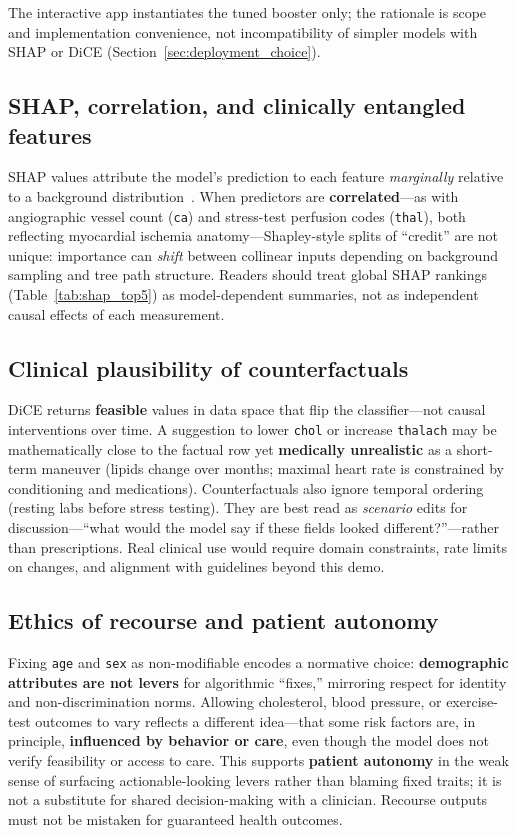 \documentclass[11pt,a4paper]{article}
\begin{document}
The interactive app instantiates the tuned booster only; the rationale is scope and implementation convenience, not incompatibility of simpler models with SHAP or DiCE (Section~\ref{sec:deployment_choice}).

\subsection{SHAP, correlation, and clinically entangled features}

SHAP values attribute the model's prediction to each feature \emph{marginally} relative to a background distribution~\cite{lundberg}. When predictors are \textbf{correlated}—as with angiographic vessel count (\texttt{ca}) and stress-test perfusion codes (\texttt{thal}), both reflecting myocardial ischemia anatomy—Shapley-style splits of ``credit'' are not unique: importance can \emph{shift} between collinear inputs depending on background sampling and tree path structure. Readers should treat global SHAP rankings (Table~\ref{tab:shap_top5}) as model-dependent summaries, not as independent causal effects of each measurement.

\subsection{Clinical plausibility of counterfactuals}

DiCE returns \textbf{feasible} values in data space that flip the classifier—not causal interventions over time. A suggestion to lower \texttt{chol} or increase \texttt{thalach} may be mathematically close to the factual row yet \textbf{medically unrealistic} as a short-term maneuver (lipids change over months; maximal heart rate is constrained by conditioning and medications). Counterfactuals also ignore temporal ordering (resting labs before stress testing). They are best read as \emph{scenario} edits for discussion—``what would the model say if these fields looked different?''—rather than prescriptions. Real clinical use would require domain constraints, rate limits on changes, and alignment with guidelines beyond this demo.

\subsection{Ethics of recourse and patient autonomy}

Fixing \texttt{age} and \texttt{sex} as non-modifiable encodes a normative choice: \textbf{demographic attributes are not levers} for algorithmic ``fixes,'' mirroring respect for identity and non-discrimination norms. Allowing cholesterol, blood pressure, or exercise-test outcomes to vary reflects a different idea—that some risk factors are, in principle, \textbf{influenced by behavior or care}, even though the model does not verify feasibility or access to care. This supports \textbf{patient autonomy} in the weak sense of surfacing actionable-looking levers rather than blaming fixed traits; it is not a substitute for shared decision-making with a clinician. Recourse outputs must not be mistaken for guaranteed health outcomes.
\end{document}
